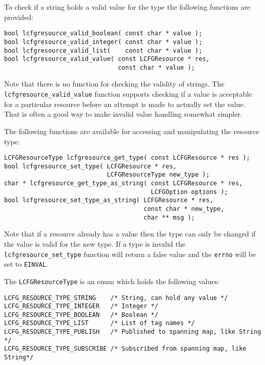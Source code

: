 \documentclass[11pt,a4paper,titlepage]{article}
\begin{document}
To check if a string holds a valid value for the type the following
functions are provided:

\begin{verbatim}
bool lcfgresource_valid_boolean( const char * value );
bool lcfgresource_valid_integer( const char * value );
bool lcfgresource_valid_list(    const char * value );
bool lcfgresource_valid_value( const LCFGResource * res,
                               const char * value );
\end{verbatim}

Note that there is no function for checking the validity of
strings. The \texttt{lcfgresource\_valid\_value} function supports
checking if a value is acceptable for a particular resource before an
attempt is made to actually set the value. That is often a good way to
make invalid value handling somewhat simpler.

The following functions are available for accessing and manipulating
the resource type:

\begin{verbatim}
LCFGResourceType lcfgresource_get_type( const LCFGResource * res );
bool lcfgresource_set_type( LCFGResource * res,
                            LCFGResourceType new_type );
char * lcfgresource_get_type_as_string( const LCFGResource * res,
                                        LCFGOption options );
bool lcfgresource_set_type_as_string( LCFGResource * res,
                                      const char * new_type,
                                      char ** msg );
\end{verbatim}

Note that if a resource already has a value then the type can only be
changed if the value is valid for the new type. If a type
is invalid the \texttt{lcfgresource\_set\_type} function will return a
false value and the \texttt{errno} will be set to \texttt{EINVAL}. 

The \texttt{LCFGResourceType} is an enum which holds the following
values:

\begin{verbatim}
LCFG_RESOURCE_TYPE_STRING    /* String, can hold any value */
LCFG_RESOURCE_TYPE_INTEGER   /* Integer */
LCFG_RESOURCE_TYPE_BOOLEAN   /* Boolean */
LCFG_RESOURCE_TYPE_LIST      /* List of tag names */
LCFG_RESOURCE_TYPE_PUBLISH   /* Published to spanning map, like String */
LCFG_RESOURCE_TYPE_SUBSCRIBE /* Subscribed from spanning map, like String*/
\end{verbatim}
\end{document}
